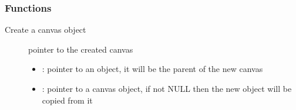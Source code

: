 \documentclass[letterpaper,10pt,english]{sphinxmanual}
\begin{document}
\subsubsection*{Functions}

\begin{fulllineitems}
\label{\detokenize{object-types/canvas:_CPPv416lv_canvas_createP8lv_obj_tPK8lv_obj_t}}%
\pysigstartmultiline
{}\label{\detokenize{object-types/canvas:lv__canvas_8h_1ac89798c0aadacdba97226c0679a7ed8c}}%
\pysigstopmultiline
Create a canvas object \begin{description}
\item[{}] \leavevmode
pointer to the created canvas 

\item[{}] \leavevmode\begin{itemize}
\item {} 
: pointer to an object, it will be the parent of the new canvas 

\item {} 
: pointer to a canvas object, if not NULL then the new object will be copied from it 

\end{itemize}

\end{description}


\end{fulllineitems}

\end{document}
